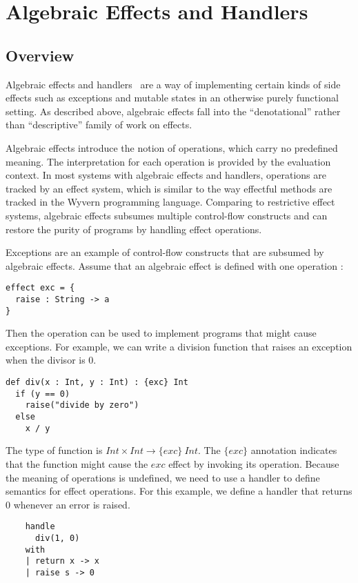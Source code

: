 \section{Algebraic Effects and Handlers}

\subsection{Overview}
  Algebraic effects and handlers~\cite{plotkin03,plotkin09} are a way of implementing certain kinds of side effects such as exceptions and mutable states in an otherwise purely functional setting.  As described above, algebraic effects fall into the ``denotational'' rather than ``descriptive'' family of work on effects. 
  
Algebraic effects introduce the notion of operations, which carry no predefined meaning. The interpretation for each operation is provided by the evaluation context. In most systems with algebraic effects and handlers, operations are tracked by an effect system, which is similar to the way effectful methods are tracked in the Wyvern programming language. Comparing to restrictive effect systems, algebraic effects subsumes multiple control-flow constructs and can restore the purity of programs by handling effect operations.

Exceptions are an example of control-flow constructs that are subsumed by algebraic effects. Assume that an algebraic effect  is defined with one operation :
\begin{verbatim}
effect exc = {
  raise : String -> a
}
\end{verbatim}
Then the operation  can be used to implement programs that might cause exceptions. For example, we can write a division function that raises an exception when the divisor is 0.
\begin{verbatim}
def div(x : Int, y : Int) : {exc} Int
  if (y == 0)
    raise("divide by zero")
  else
    x / y
\end{verbatim}

The type of function  is $Int \times Int \rightarrow \{exc\}\ Int$. The $\{exc\}$ annotation indicates that the function might cause the $exc$ effect by invoking its operation. Because the meaning of operations is undefined, we need to use a handler to define semantics for effect operations. For this example, we define a handler that returns 0 whenever an error is raised.

\begin{verbatim}
	handle 
	  div(1, 0)
	with 
	| return x -> x
	| raise s -> 0
\end{verbatim}

